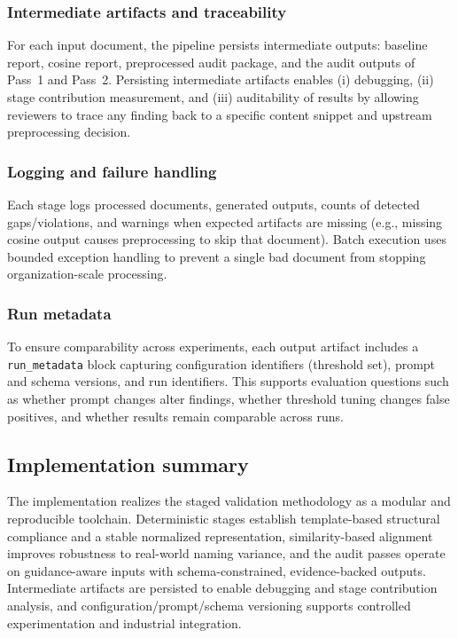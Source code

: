 \subsubsection{Intermediate artifacts and traceability}
For each input document, the pipeline persists intermediate outputs: baseline report, cosine report, preprocessed audit package, and the audit outputs of Pass~1 and Pass~2. Persisting intermediate artifacts enables (i) debugging, (ii) stage contribution measurement, and (iii) auditability of results by allowing reviewers to trace any finding back to a specific content snippet and upstream preprocessing decision.

\subsubsection{Logging and failure handling}
Each stage logs processed documents, generated outputs, counts of detected gaps/violations, and warnings when expected artifacts are missing (e.g., missing cosine output causes preprocessing to skip that document). Batch execution uses bounded exception handling to prevent a single bad document from stopping organization-scale processing.

\subsubsection{Run metadata}
To ensure comparability across experiments, each output artifact includes a \texttt{run\_metadata} block capturing configuration identifiers (threshold set), prompt and schema versions, and run identifiers. This supports evaluation questions such as whether prompt changes alter findings, whether threshold tuning changes false positives, and whether results remain comparable across runs.

\subsection{Implementation summary}
The implementation realizes the staged validation methodology as a modular and reproducible toolchain. Deterministic stages establish template-based structural compliance and a stable normalized representation, similarity-based alignment improves robustness to real-world naming variance, and the audit passes operate on guidance-aware inputs with schema-constrained, evidence-backed outputs. Intermediate artifacts are persisted to enable debugging and stage contribution analysis, and configuration/prompt/schema versioning supports controlled experimentation and industrial integration.
